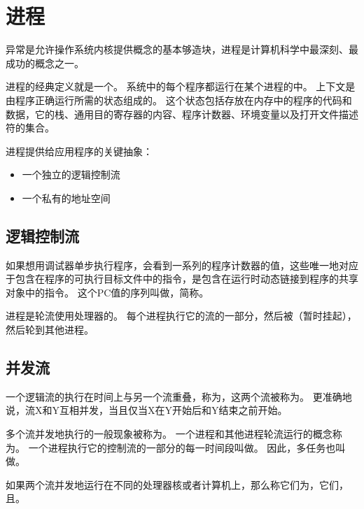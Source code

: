 
\section{进程}
{
    异常是允许操作系统内核提供概念的基本够造块，进程是计算机科学中最深刻、最成功的概念之一。

    进程的经典定义就是一个。
    系统中的每个程序都运行在某个进程的中。
    上下文是由程序正确运行所需的状态组成的。
    这个状态包括存放在内存中的程序的代码和数据，它的栈、通用目的寄存器的内容、程序计数器、环境变量以及打开文件描述符的集合。

    进程提供给应用程序的关键抽象：

    \begin{itemize}
        \item 一个独立的逻辑控制流
        \item 一个私有的地址空间
    \end{itemize}

    \subsection{逻辑控制流}
    {
        如果想用调试器单步执行程序，会看到一系列的程序计数器的值，这些唯一地对应于包含在程序的可执行目标文件中的指令，是包含在运行时动态链接到程序的共享对象中的指令。
        这个PC值的序列叫做，简称。

        进程是轮流使用处理器的。
        每个进程执行它的流的一部分，然后被（暂时挂起），然后轮到其他进程。
    }

    \subsection{并发流}
    {
        一个逻辑流的执行在时间上与另一个流重叠，称为，这两个流被称为。
        更准确地说，流X和Y互相并发，当且仅当X在Y开始后和Y结束之前开始。

        多个流并发地执行的一般现象被称为。
        一个进程和其他进程轮流运行的概念称为。
        一个进程执行它的控制流的一部分的每一时间段叫做。
        因此，多任务也叫做。

        如果两个流并发地运行在不同的处理器核或者计算机上，那么称它们为，它们，且。

}}
